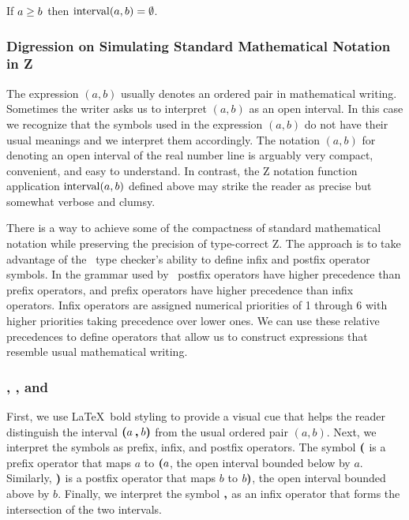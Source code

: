 \documentclass[11pt, oneside]{article}
\begin{document}
\begin{remark}
If $a \mathrel{\geq} b$ then $\operatorname{interval}(a,b) = \emptyset$.
\end{remark}

\subsubsection{Digression on Simulating Standard Mathematical Notation in Z}

The expression $(a,b)$ usually denotes an ordered pair in mathematical writing.
Sometimes the writer asks us to interpret $(a,b)$ as an open interval.
In this case we recognize that the symbols used in the expression $(a,b)$ do not have their usual meanings
and we interpret them accordingly.
The notation $(a,b)$ for denoting an open interval of the real number line is
arguably very compact, convenient, and easy to understand. 
In contrast, the Z notation function application $\operatorname{interval}(a,b)$ defined above may strike the reader as
precise but somewhat verbose and clumsy.

There is a way to achieve some of the compactness of standard mathematical notation while
preserving the precision of type-correct Z.
The approach is to take advantage of the \fuzz\ type checker's ability to define infix and postfix 
operator symbols. 
In the grammar used by \fuzz\ postfix operators have higher precedence than prefix operators,
and prefix operators have higher precedence than infix operators.
Infix operators are assigned numerical priorities of 1 through 6 with higher priorities taking precedence 
over lower ones.
We can use these relative precedences to define operators that allow us to construct expressions 
that resemble usual mathematical writing.

\subsubsection{, , and }

First, we use \LaTeX\ bold styling to provide a visual cue that helps the reader
distinguish the interval $\boldsymbol{(} a \mathbin{\boldsymbol{,}} b \boldsymbol{)}$ from the
usual ordered pair $(a,b)$.
Next, we interpret the symbols as prefix, infix, and postfix operators.
The symbol $\boldsymbol{(}$ is a prefix operator that maps $a$ to $\boldsymbol{(} a$, 
the open interval bounded below by $a$.
Similarly, $\boldsymbol{)}$ is a postfix operator that maps $b$ to $b \boldsymbol{)}$, 
the open interval bounded above by $b$.
Finally, we interpret the symbol $\mathbin{\boldsymbol{,}}$ as an infix operator that forms the intersection of the two intervals.
\end{document}
